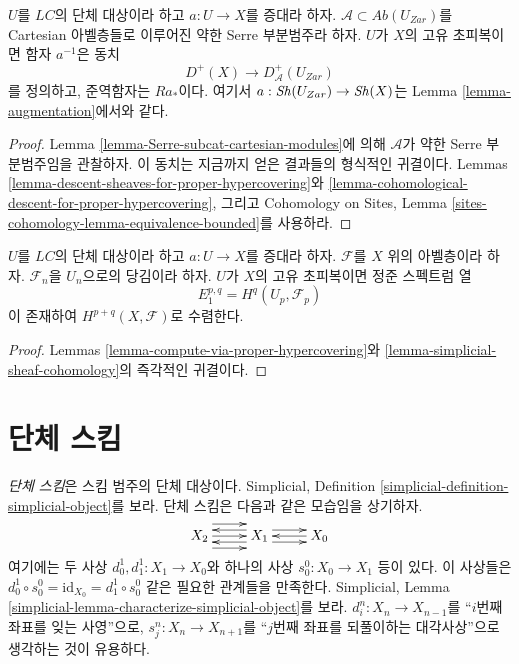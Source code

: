 \begin{lemma}
\label{lemma-proper-hypercovering-equivalence-bounded}
$U$를 $\textit{LC}$의 단체 대상이라 하고 $a : U \to X$를 증대라 하자.
$\mathcal{A} \subset \textit{Ab}(U_{Zar})$를 Cartesian 아벨층들로 이루어진
약한 Serre 부분범주라 하자. $U$가 $X$의 고유 초피복이면 함자 $a^{-1}$은
동치
$$
D^+(X) \longrightarrow D_\mathcal{A}^+(U_{Zar})
$$
를 정의하고, 준역함자는 $Ra_*$이다. 여기서
$a : \mathop{\mathit{Sh}}\nolimits(U_{Zar}) \to \mathop{\mathit{Sh}}\nolimits(X)$는 Lemma \ref{lemma-augmentation}에서와 같다.
\end{lemma}

\begin{proof}
Lemma \ref{lemma-Serre-subcat-cartesian-modules}에 의해 $\mathcal{A}$가
약한 Serre 부분범주임을 관찰하자.
이 동치는 지금까지 얻은 결과들의 형식적인 귀결이다. Lemmas
\ref{lemma-descent-sheaves-for-proper-hypercovering}와
\ref{lemma-cohomological-descent-for-proper-hypercovering}, 그리고
Cohomology on Sites, Lemma
\ref{sites-cohomology-lemma-equivalence-bounded}를 사용하라.
\end{proof}

\begin{lemma}
\label{lemma-spectral-sequence-proper-hypercovering}
$U$를 $\textit{LC}$의 단체 대상이라 하고 $a : U \to X$를 증대라 하자.
$\mathcal{F}$를 $X$ 위의 아벨층이라 하자. $\mathcal{F}_n$을 $U_n$으로의
당김이라 하자. $U$가 $X$의 고유 초피복이면 정준 스펙트럼 열
$$
E_1^{p, q} = H^q(U_p, \mathcal{F}_p)
$$
이 존재하여 $H^{p + q}(X, \mathcal{F})$로 수렴한다.
\end{lemma}

\begin{proof}
Lemmas \ref{lemma-compute-via-proper-hypercovering}와
\ref{lemma-simplicial-sheaf-cohomology}의 즉각적인 귀결이다.
\end{proof}

\section{단체 스킴}
\label{section-simplicial}

\noindent
{\it 단체 스킴}은 스킴 범주의 단체 대상이다. Simplicial, Definition
\ref{simplicial-definition-simplicial-object}를 보라.
단체 스킴은 다음과 같은 모습임을 상기하자.
$$
\xymatrix{
X_2
\ar@<2ex>[r]
\ar@<0ex>[r]
\ar@<-2ex>[r]
&
X_1
\ar@<1ex>[r]
\ar@<-1ex>[r]
\ar@<1ex>[l]
\ar@<-1ex>[l]
&
X_0
\ar@<0ex>[l]
}
$$
여기에는 두 사상 $d^1_0, d^1_1 : X_1 \to X_0$와 하나의 사상
$s^0_0 : X_0 \to X_1$ 등이 있다. 이 사상들은
$d^1_0 \circ s^0_0 = \text{id}_{X_0} = d^1_1 \circ s^0_0$ 같은 필요한
관계들을 만족한다. Simplicial, Lemma
\ref{simplicial-lemma-characterize-simplicial-object}를 보라.
$d^n_i : X_n \to X_{n - 1}$를 “$i$번째 좌표를 잊는 사영”으로,
$s^n_j : X_n \to X_{n + 1}$를 “$j$번째 좌표를 되풀이하는 대각사상”으로
생각하는 것이 유용하다.

